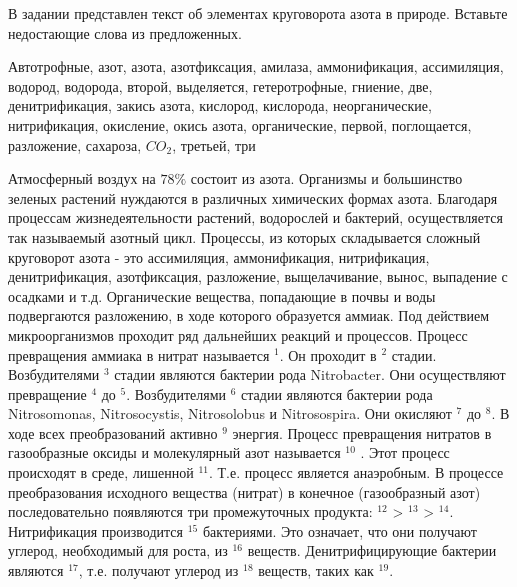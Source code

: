 
В задании представлен текст об элементах круговорота азота в природе. Вставьте 
недостающие слова из предложенных.

Автотрофные, азот, азота, азотфиксация, амилаза, аммонификация, ассимиляция, водород, 
водорода, второй, выделяется, гетеротрофные, гниение, две, денитрификация, закись азота, 
кислород, кислорода, неорганические, нитрификация, окисление,  окись азота, органические, 
первой, поглощается, разложение, сахароза, $CO_2$, третьей, три

Атмосферный воздух на $78\%$ состоит из азота. Организмы и большинство зеленых растений 
нуждаются в различных химических формах азота. Благодаря процессам жизнедеятельности растений, 
водорослей и бактерий, осуществляется так называемый азотный цикл. Процессы, из которых 
складывается сложный круговорот азота - это ассимиляция, аммонификация, нитрификация, 
денитрификация, азотфиксация, разложение, выщелачивание, вынос, выпадение с осадками и т.д. 
Органические вещества, попадающие в почвы и воды подвергаются разложению, в ходе которого 
образуется аммиак. Под действием микроорганизмов проходит ряд дальнейших реакций и процессов. 
Процесс превращения аммиака в нитрат называется \makebox[2cm]{\hrulefill}$^1$. Он проходит в
\makebox[2cm]{\hrulefill}$^2$ стадии. Возбудителями \makebox[2cm]{\hrulefill}$^3$ стадии являются 
бактерии рода Nitrobacter. Они осуществляют превращение \makebox[2cm]{\hrulefill}$^4$ до
\makebox[2cm]{\hrulefill}$^5$. Возбудителями \makebox[2cm]{\hrulefill}$^6$ стадии являются бактерии 
рода Nitrosomonas, \linebreak Nitrosocystis, Nitrosolobus и Nitrosospira. Они окисляют \makebox[2cm]{\hrulefill}$^7$
до \makebox[2cm]{\hrulefill}$^8$. В ходе всех преобразований активно \makebox[2cm]{\hrulefill}$^9$ 
энергия. Процесс превращения нитратов в газообразные оксиды и молекулярный азот называется \makebox[2cm]{\hrulefill}$^{10}$
. Этот процесс происходят в среде, лишенной \makebox[2cm]{\hrulefill}$^{11}$. Т.е. процесс является 
анаэробным. В процессе преобразования исходного вещества (нитрат) в конечное 
(газообразный азот) последовательно появляются три промежуточных продукта: \makebox[2cm]{\hrulefill}$^{12}$ > 
\makebox[2cm]{\hrulefill}$^{13}$ > \makebox[2cm]{\hrulefill}$^{14}$. Нитрификация производится \makebox[2cm]{\hrulefill}$^{15}$ 
бактериями. Это означает, что они получают углерод, необходимый для роста, из \makebox[2cm]{\hrulefill}$^{16}$ веществ. 
Денитрифицирующие бактерии являются \makebox[2cm]{\hrulefill}$^{17}$, т.е. получают углерод из \makebox[2cm]{\hrulefill}$^{18}$ 
веществ, таких как \makebox[2cm]{\hrulefill}$^{19}$.

